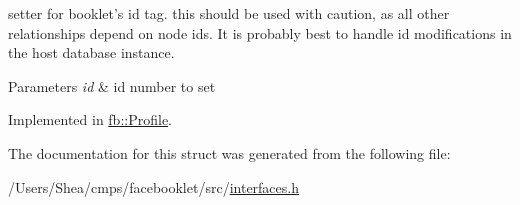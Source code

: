 setter for booklet's id tag.  this should be used with caution, as all other relationships depend on node ids. It is probably best to handle id modifications in the host database instance. 


\begin{DoxyParams}{Parameters}
{\em id} & id number to set \\
\hline
\end{DoxyParams}


Implemented in \hyperlink{classfb_1_1_profile_a8fe32885a03ac7c92675ede58a230f34}{fb\+::\+Profile}.



The documentation for this struct was generated from the following file\+:\begin{DoxyCompactItemize}
\item 
/\+Users/\+Shea/cmps/facebooklet/src/\hyperlink{interfaces_8h}{interfaces.\+h}\end{DoxyCompactItemize}
